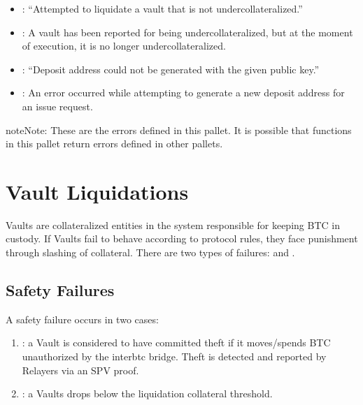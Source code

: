 \documentclass[a4paper,10pt,english]{sphinxmanual}
\begin{document}
\begin{itemize}
\item {} 
: “Attempted to liquidate a vault that is not undercollateralized.”

\item {} 
: A vault has been reported for being undercollateralized, but at the moment of execution, it is no longer undercollateralized.

\end{itemize}

\begin{itemize}
\item {} 
: “Deposit address could not be generated with the given public key.”

\item {} 
: An error occurred while attempting to generate a new deposit address for an issue request.

\end{itemize}

\begin{sphinxadmonition}{note}{Note:}
These are the errors defined in this pallet. It is possible that functions in this pallet return errors defined in other pallets.
\end{sphinxadmonition}


\chapter{Vault Liquidations}
\label{\detokenize{security_performance/liquidations:vault-liquidations}}\label{\detokenize{security_performance/liquidations:liquidations}}\label{\detokenize{security_performance/liquidations::doc}}
Vaults are collateralized entities in the system responsible for keeping BTC in custody.
If Vaults fail to behave according to protocol rules, they face punishment through slashing of collateral. There are two types of failures:  and .


\section{Safety Failures}
\label{\detokenize{security_performance/liquidations:safety-failures}}
A safety failure occurs in two cases:
\begin{enumerate}
%
\item {} 
: a Vault is considered to have committed theft if it moves/spends BTC unauthorized by the interbtc bridge. Theft is detected and reported by Relayers via an SPV proof.

\item {} 
: a Vaults drops below the  liquidation collateral threshold.

\end{enumerate}
\end{document}
